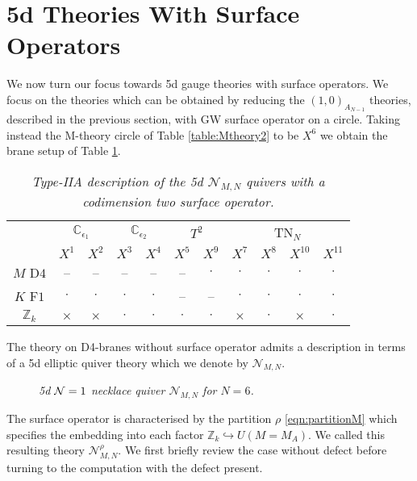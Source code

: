 \documentclass[main.tex]{subfiles}
\begin{document}
\section{5d Theories With Surface Operators}\label{Sec:5dloc}
We now turn our focus towards 5d gauge theories with surface operators. We focus on the theories which can be obtained by reducing the $(1,0)_{A_{N-1}}$ theories, described in the previous section, with GW surface operator on a circle. Taking instead the M-theory circle of Table \ref{table:Mtheory2} to be $X^6$ we obtain the brane setup of Table \ref{table:Mtheory3}. 
\begin{table}[ht!]
\centering
\begin{tabular}{ c |c| c| c| c| c| c| c| c| c| c|}
&\multicolumn{2}{c|}{$\mathbb{C}_{\epsilon_1}$}&\multicolumn{2}{c|}{$\mathbb{C}_{\epsilon_2}$}&\multicolumn{2}{c|}{$T^2$}&\multicolumn{4}{c|}{TN$_N$}\\
   & $X^1$ & $X^2$ & $X^3$ & $X^4$ & $X^5$ & $X^9$ & $X^7$ & $X^8$& $X^{10}$&$X^{11}$\\\hline 
 $M$ D$4$ & -- & -- & -- & -- & -- & $\cdot$ & $\cdot$ & $\cdot$ & $\cdot$&$\cdot$\\ \hline
  $K$ F$1$ & $\cdot$ & $\cdot$ & $\cdot$ & $\cdot$ & -- & --&$\cdot$ & $\cdot$  & $\cdot$ & $\cdot$ \\\hline
  $\mathbb{Z}_k$ & $\times$ & $\times$ & $\cdot$ & $\cdot$ &  $\cdot$ & $\cdot$  & $\times$&$\cdot$ & $\times$ & $\cdot$ \\\hline
\end{tabular}
\caption{\textit{Type-IIA description of the 5d $\mathcal{N}_{M,N}$ quivers with a codimension two surface operator.}}
\label{table:Mtheory3}
\end{table}
The theory on D4-branes without surface operator admits a description in terms of a 5d elliptic quiver theory which we denote by $\mathcal{N}_{M,N}$.
\begin{figure}
\centering
{}
  \caption{\it 5d $\mathcal{N}=1$ necklace quiver $\mathcal{N}_{M,N}$ for $N=6$.}
  \label{fig:Skquiver}
\end{figure}
The surface operator is characterised by the partition $\rho$ \eqref{eqn:partitionM} which specifies the embedding into each factor $\mathbb{Z}_k\hookrightarrow U(M=M_A)$.
We called this resulting theory $\mathcal{N}^{\rho}_{M,N}$. We first briefly review the case without defect before turning to the computation with the defect present.
\end{document}
